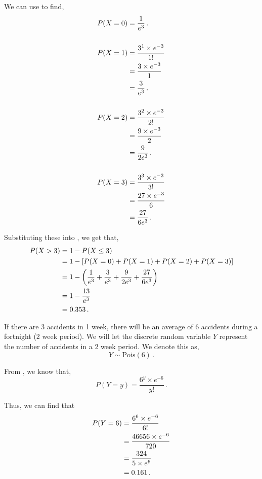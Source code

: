 \begin{subquestions}
\begin{subsubquestions}
We can use  to find, 
\begin{align}
	P(X=0) & = \frac{1}{e^3} \,. \\ \nonumber \\
	P(X=1) & = \frac{ 3^1 \times e^{-3}}{1!} \nonumber \\
	       & = \frac{3 \times e^{-3}}{1} \nonumber \\
	       & = \frac{3}{e^3} \,. \\ \nonumber \\
	P(X=2) & = \frac{ 3^2 \times e^{-3}}{2!} \nonumber \\
	       & = \frac{9 \times e^{-3}}{2} \nonumber \\
	       & = \frac{9}{2e^3} \,. \\ \nonumber \\
	P(X=3) & = \frac{ 3^3 \times e^{-3}}{3!} \nonumber \\
	       & = \frac{27 \times e^{-3}}{6} \nonumber \\
	       & = \frac{27}{6e^3} \,. 
\end{align}

Substituting these into , we get that,
\begin{align}
	P(X>3) & =1-P(X \leq 3) \nonumber \\
	& = 1 - [P(X=0)+P(X=1)+P(X=2)+P(X=3)] \nonumber \\
	& = 1 - \left(\frac{1}{e^3} + \frac{3}{e^3} + \frac{9}{2e^3} + \frac{27}{6e^3} \right) \nonumber \\
	& = 1 - \frac{13}{e^3} \nonumber \\
	& = 0.353 \,.
\end{align}

\subsubquestion

If there are 3 accidents in 1 week, there will be an average of 6 accidents during a fortnight (2 week period). We will let the discrete random variable $Y$ represent the number of accidents in a 2 week period. We denote this as,
\begin{equation}
	Y \sim \text{Pois}(6) \,.
\end{equation} 

From , we know that,
\begin{equation}
	P(Y = y) =\frac{ 6 ^ y \times e^{-6}}{y!} \,.
\end{equation}

Thus, we can find that
\begin{align}
	P(Y = 6) & = \frac{ 6 ^ 6 \times e^{-6}}{6!} \nonumber \\	
	         & = \frac{46656 \times e^{-6}}{720} \nonumber \\
	         & = \frac{324}{5 \times e^6} \nonumber \\
	         & = 0.161 \,.
\end{align}


\end{subsubquestions}
\end{subquestions}
